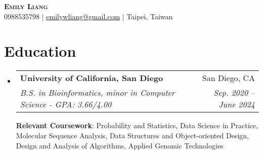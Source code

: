 \documentclass[letterpaper,11pt]{article}
\makeatletter
\newcommand{\resumeItem}[1]{
  \item\small{
    {#1 \vspace{-2pt}}
  }
}
\newcommand{\resumeSubheading}[4]{
  \vspace{-2pt}\item
    \begin{tabular*}{0.97\textwidth}[t]{l@{\extracolsep{\fill}}r}
      \textbf{#1} & #2 \\
      \textit{\small#3} & \textit{\small #4} \\
    \end{tabular*}\vspace{-7pt}
}
\newcommand{\resumeSubHeadingListStart}{\begin{itemize}[leftmargin=0.15in, label={}]}
\newcommand{\resumeSubHeadingListEnd}{\end{itemize}}
\newcommand{\resumeItemListStart}{\begin{itemize}}
\newcommand{\resumeItemListEnd}{\end{itemize}\vspace{-5pt}}
\makeatother
\begin{document}

\begin{center}
    \textbf{\Huge \scshape Emily Liang} \\ \vspace{1pt}
    \small 0988535798 $|$ \href{mailto:x@x.com}{\underline{emilywliang@gmail.com}} 
    $|$ {\small{Taipei, Taiwan}}
\end{center}


\section{Education}
  \resumeSubHeadingListStart
    \resumeSubheading
      {University of California, San Diego}{San Diego, CA}
      {B.S. in Bioinformatics, minor in Computer Science - GPA: 3.66/4.00}{Sep. 2020 -- June 2024}\hfill \break



  \textbf{Relevant Coursework}{: Probability and Statistics, Data Science in Practice, Molecular Sequence Analysis, Data Structures and Object-oriented Design, Design and Analysis of Algorithms, Applied Genomic Technologies} 
      
  \resumeSubHeadingListEnd



      
\end{document}
